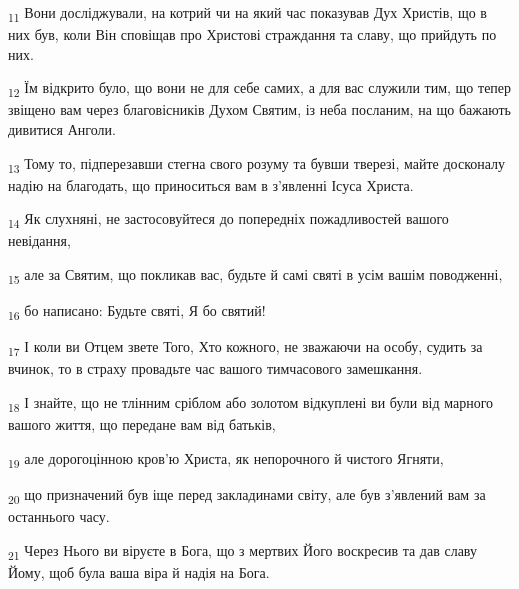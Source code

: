 \begin{tcolorbox}
\textsubscript{11} Вони досліджували, на котрий чи на який час показував Дух Христів, що в них був, коли Він сповіщав про Христові страждання та славу, що прийдуть по них.
\end{tcolorbox}
\begin{tcolorbox}
\textsubscript{12} Їм відкрито було, що вони не для себе самих, а для вас служили тим, що тепер звіщено вам через благовісників Духом Святим, із неба посланим, на що бажають дивитися Анголи.
\end{tcolorbox}
\begin{tcolorbox}
\textsubscript{13} Тому то, підперезавши стегна свого розуму та бувши тверезі, майте досконалу надію на благодать, що приноситься вам в з'явленні Ісуса Христа.
\end{tcolorbox}
\begin{tcolorbox}
\textsubscript{14} Як слухняні, не застосовуйтеся до попередніх пожадливостей вашого невідання,
\end{tcolorbox}
\begin{tcolorbox}
\textsubscript{15} але за Святим, що покликав вас, будьте й самі святі в усім вашім поводженні,
\end{tcolorbox}
\begin{tcolorbox}
\textsubscript{16} бо написано: Будьте святі, Я бо святий!
\end{tcolorbox}
\begin{tcolorbox}
\textsubscript{17} І коли ви Отцем звете Того, Хто кожного, не зважаючи на особу, судить за вчинок, то в страху провадьте час вашого тимчасового замешкання.
\end{tcolorbox}
\begin{tcolorbox}
\textsubscript{18} І знайте, що не тлінним сріблом або золотом відкуплені ви були від марного вашого життя, що передане вам від батьків,
\end{tcolorbox}
\begin{tcolorbox}
\textsubscript{19} але дорогоцінною кров'ю Христа, як непорочного й чистого Ягняти,
\end{tcolorbox}
\begin{tcolorbox}
\textsubscript{20} що призначений був іще перед закладинами світу, але був з'явлений вам за останнього часу.
\end{tcolorbox}
\begin{tcolorbox}
\textsubscript{21} Через Нього ви віруєте в Бога, що з мертвих Його воскресив та дав славу Йому, щоб була ваша віра й надія на Бога.
\end{tcolorbox}
